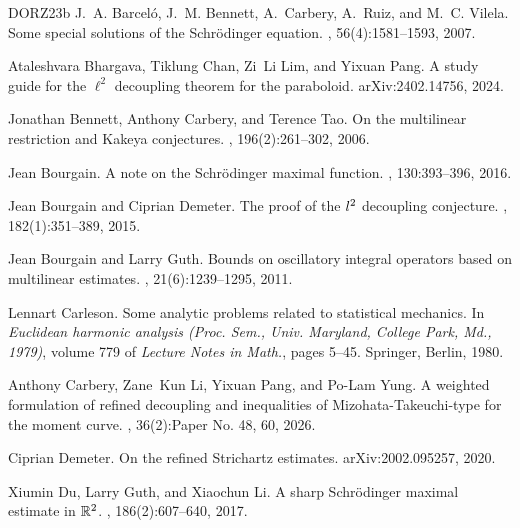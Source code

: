 \documentclass[11pt]{amsart}
\theoremstyle{definition}
\theoremstyle{remark}
\numberwithin{equation}{section}
\begin{document}
%  
%
\newcommand{\etalchar}[1]{$^{#1}$}
\begin{thebibliography}{DORZ23b}
	\bibitem[BBC{\etalchar{+}}07]{BBCRV}
	J.~A. Barcel\'{o}, J.~M. Bennett, A.~Carbery, A.~Ruiz, and M.~C. Vilela.
	\newblock Some special solutions of the {S}chr\"{o}dinger equation.
	, 56(4):1581--1593, 2007.
	
	Ataleshvara Bhargava, Tiklung Chan, Zi~Li Lim, and Yixuan Pang.
	\newblock A study guide for the $\ell^2$ decoupling theorem for the paraboloid.
	\newblock arXiv:2402.14756, 2024.
	
	Jonathan Bennett, Anthony Carbery, and Terence Tao.
	\newblock On the multilinear restriction and {K}akeya conjectures.
	, 196(2):261--302, 2006.
	
	Jean Bourgain.
	\newblock A note on the {S}chr\"{o}dinger maximal function.
	, 130:393--396, 2016.
	
	Jean Bourgain and Ciprian Demeter.
	\newblock The proof of the {$l\sp 2$} decoupling conjecture.
	, 182(1):351--389, 2015.
	
	Jean Bourgain and Larry Guth.
	\newblock Bounds on oscillatory integral operators based on multilinear
	estimates.
	, 21(6):1239--1295, 2011.
	

	
	Lennart Carleson.
	\newblock Some analytic problems related to statistical mechanics.
	\newblock In {\em Euclidean harmonic analysis ({P}roc. {S}em., {U}niv.
		{M}aryland, {C}ollege {P}ark, {M}d., 1979)}, volume 779 of {\em Lecture Notes
		in Math.}, pages 5--45. Springer, Berlin, 1980.
	
	Anthony Carbery, Zane~Kun Li, Yixuan Pang, and Po-Lam Yung.
	\newblock A weighted formulation of refined decoupling and inequalities of
	{M}izohata-{T}akeuchi-type for the moment curve.
	, 36(2):Paper No. 48, 60, 2026.
	
	Ciprian Demeter.
	\newblock On the refined {S}trichartz estimates.
	\newblock arXiv:2002.095257, 2020.
	
	Xiumin Du, Larry Guth, and Xiaochun Li.
	\newblock A sharp {S}chr\"{o}dinger maximal estimate in {$\Bbb R^2$}.
	, 186(2):607--640, 2017.
	

\end{thebibliography}
\end{document}
